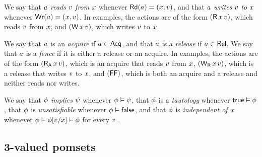 We say that $a$ \emph{reads} $v$ \emph{from} $x$ whenever
$\mathsf{Rd}(a) = (x,v)$, and that $a$ \emph{writes} $v$
\emph{to} $x$ whenever $\mathsf{Wr}(a) = (x,v)$.  In examples,
the actions are of the form $(\DR{\aLoc}{\aVal})$, which reads $v$ from
$x$, and $(\DW{\aLoc}{\aVal})$, which writes $v$ to $x$.

We say that $a$ is an \emph{acquire} if $a\in\mathsf{Acq}$, and that $a$
is a \emph{release} if $a\in\mathsf{Rel}$.  We say that $a$ is a \emph{fence}
if it is either a release or an acquire.  In examples, the actions are of the
form $(\DRAcq{\aLoc}{\aVal})$, which is an acquire that reads $v$ from
$x$, $(\DWRel{\aLoc}{\aVal})$, which is a release that writes $v$ to
$x$, and $(\mathsf{FF})$, which is both an acquire and a release and neither
reads nor writes.

We say that $\phi$ \emph{implies} $\psi$ whenever $\phi\vDash\psi$,
that $\phi$ is a \emph{tautology} whenever $\mathsf{true}\vDash\phi$, that
$\phi$ is \emph{unsatisfiable} whenever $\phi\vDash\mathsf{false}$, and that
$\phi$ is \emph{independent of $x$} whenever
$\phi \vDash \phi[v/x] \vDash \phi$ for every $v$.


\subsection{3-valued pomsets}
\label{sec:pomsets}

